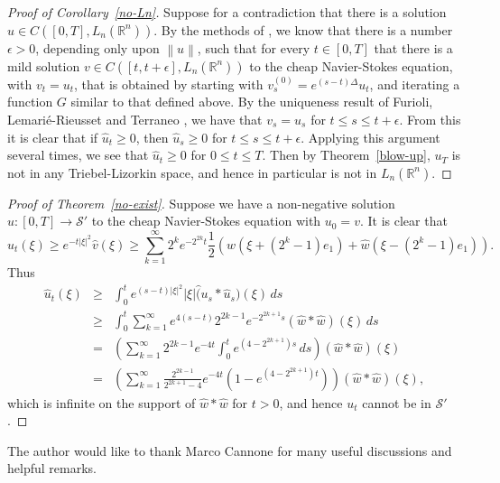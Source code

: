 \documentclass[12pt]{amsart}
\newcommand{\R}{{\mathbb R}}
\newcommand{\modo}[1]{{\left|#1\right|}}
\newcommand{\normo}[1]{{\left\|#1\right\|}}
\begin{document}
\begin{proof}[Proof of Corollary~\ref{no-Ln}]
Suppose for a contradiction that there is a solution 
$u \in C([0,T],L_n(\R^n))$.  By the methods of \cite{K}, 
we know that there is a 
number $\epsilon>0$, depending only upon $\normo u$, such that
for every $t \in [0,T]$ that there is a mild solution 
$v \in C([t,t+\epsilon],L_n(\R^n))$ to the cheap Navier-Stokes equation, 
with $v_t = u_t$, that is obtained by starting with 
$v^{(0)}_s = e^{(s-t)\Delta} u_t$,
and iterating a function $G$ similar to that defined above.  
By the uniqueness result of Furioli, Lemari\'e-Rieusset 
and Terraneo \cite{FLT},
we have that $v_s = u_s$ for $t\le s \le t+\epsilon$.
From this it is clear that if $\hat u_t \ge 0$, then
$\hat u_s \ge 0$ for $t\le s \le t+\epsilon$.  Applying this argument
several times, we see that $\hat u_t \ge 0$
for $0 \le t \le T$.
Then by Theorem~\ref{blow-up}, $u_T$ is not in any
Triebel-Lizorkin space, and hence in particular is not in
$L_n(\R^n)$.
\end{proof}

\begin{proof}[Proof of Theorem~\ref{no-exist}]
Suppose we have a non-negative solution $u:[0,T] \to {\mathcal S}'$ to 
the cheap Navier-Stokes equation with $u_0 = v$.  It is clear that
\[
\hat u_t(\xi) \ge e^{-t\modo\xi^2} \hat v(\xi)
\ge \sum_{k=1}^\infty 2^k e^{-2^{2k} t} 
{\textstyle\frac12}
(\hat w(\xi+(2^k-1)e_1)+\hat w(\xi-(2^k-1)e_1)) .
\]  
Thus
\begin{eqnarray*}
\hat u_t(\xi)
&\ge&
\int_0^t e^{(s-t)\modo\xi^2} \modo\xi \hat (u_s*\hat u_s)(\xi) \, ds \\
&\ge&
\int_0^t \sum_{k=1}^\infty 
e^{4(s-t)} 2^{2k-1} e^{-2^{2k+1}s} (\hat w * \hat w)(\xi) \, ds \\
&=&
\left(\sum_{k=1}^\infty 2^{2k-1} e^{-4t} \int_0^t e^{(4-2^{2k+1})s} \, ds \right)
(\hat w * \hat w) (\xi)\\
&=&
\left(\sum_{k=1}^\infty \frac{2^{2k-1}}{2^{2k+1}-4} e^{-4t} 
(1-e^{(4-2^{2k+1})t})\right)
(\hat w * \hat w)(\xi) ,
\end{eqnarray*}
which is infinite on the support of $\hat w * \hat w$ for $t>0$, and hence
$u_t$ cannot be in ${\mathcal S}'$.  
\end{proof}

The author would like to thank Marco Cannone for many useful discussions
and helpful remarks.
\end{document}
